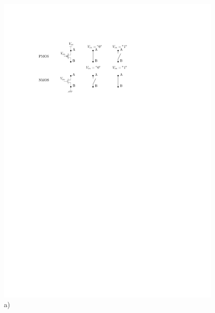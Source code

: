 \begin{figure}[htbp]
   \begin{minipage}[c]{.56\linewidth}
\includegraphics[width=\columnwidth]{Figs/nmospmos.pdf} \\\centering a)
   \end{minipage} \hfill
   \begin{minipage}[c]{.25\linewidth}

\end{minipage}
\end{figure}
